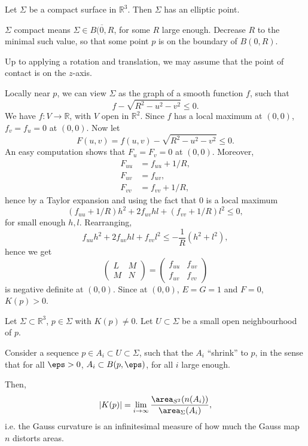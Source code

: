 \documentclass[12pt]{article}
\begin{document}

\begin{proposition}
	Let $\Sigma$ be a compact surface in $\mathbb{R}^3$. Then $\Sigma$ has an elliptic point.
\end{proposition}

\begin{proofbox}
	$\Sigma$ compact means $\Sigma \in \overline{B(0,R}$, for some $R$ large enough. Decrease $R$ to the minimal such value, so that some point $p$ is on the boundary of $B(0,R)$.

	Up to applying a rotation and translation, we may assume that the point of contact is on the $z$-axis.

	Locally near $p$, we can view $\Sigma$ as the graph of a smooth function $f$, such that
	\[
		f - \sqrt{R^2 - u^2 - v^2} \leq 0.
	\]
	We have $f : V \to \mathbb{R}$, with $V$ open in $\mathbb{R}^2$. Since $f$ has a local maximum at $(0,0)$, $f_v = f_u = 0$ at $(0,0)$. Now let
	\[
		F(u,v) = f(u, v) - \sqrt{R^2 - u^2 - v^2} \leq 0.
	\]
	An easy computation shows that $F_u = F_v = 0$ at $(0,0)$. Moreover,
	\begin{align*}
		F_{uu} &= f_{uu} + 1/R, \\
		F_{uv} &= f_{uv}, \\
		F_{vv} &= f_{vv} + 1/R,
	\end{align*}
	hence by a Taylor expansion and using the fact that $0$ is a local maximum
	\[
		(f_{uu} + 1/R)h^2 + 2f_{uv}hl + (f_{vv} + 1/R)l^2 \leq 0,
	\]
	for small enough $h, l$. Rearranging,
	\[
	f_{uu}h^2 + 2f_{uv} hl + f_{vv}l^2 \leq -\frac{1}{R}(h^2+l^2),
	\]
	hence we get
	\[
	\begin{pmatrix}
		L & M \\
		M & N
	\end{pmatrix}
	=
	\begin{pmatrix}
		f_{uu} & f_{uv} \\
		f_{uv} & f_{vv}
	\end{pmatrix}
	\]
	is negative definite at $(0,0)$. Since at $(0,0)$, $E = G = 1$ and $F = 0$, $K(p) > 0$.
\end{proofbox}

\begin{theorem}
	Let $\Sigma \subset \mathbb{R}^3$, $p \in \Sigma$ with $K(p) \neq 0$. Let $U \subset \Sigma$ be a small open neighbourhood of $p$.

	Consider a sequence $p \in A_i \subset U \subset \Sigma$, such that the $A_i$ ``shrink'' to $p$, in the sense that for all $\eps > 0$, $A_i \subset B(p, \eps)$, for all $i$ large enough.

	Then,
	\[
	|K(p)| = \lim_{i \to \infty} \frac{\area_{S^2}(n(A_i))}{\area_{\Sigma}(A_i)},
	\]
	i.e. the Gauss curvature is an infinitesimal measure of how much the Gauss map $n$ distorts areas.
\end{theorem}
\end{document}
